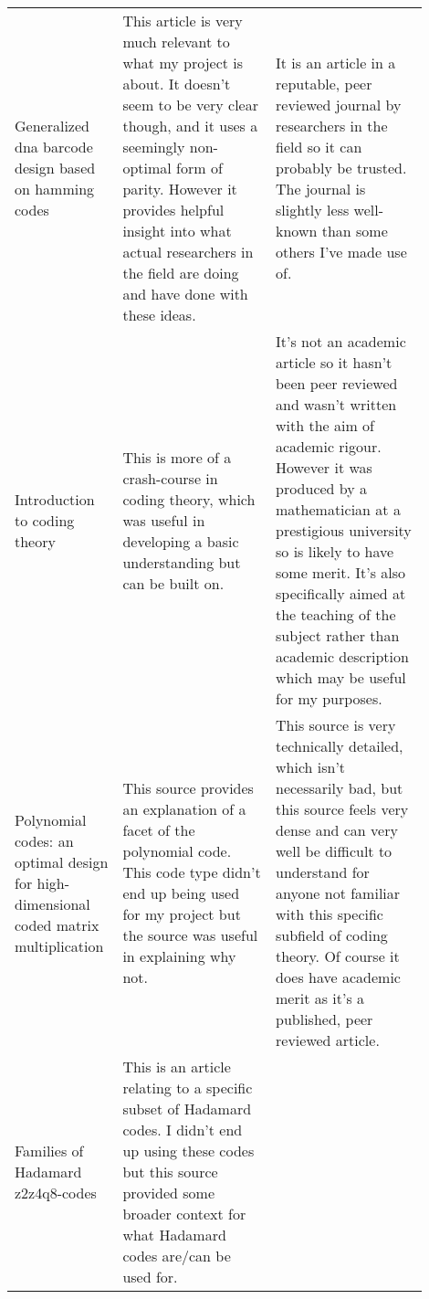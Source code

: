 \documentclass[a4paper,11pt]{article}
\begin{document}
\begin{center}
{\begin{longtable}{p{0.2\linewidth} p{0.35\linewidth} p{0.35\linewidth}}
    Generalized dna barcode design based on hamming codes \cite{HammingBarcodes2012BystrykhLeonid} &

    This article is very much relevant to what my project is about. It doesn't
    seem to be very clear though, and it uses a seemingly non-optimal form of
    parity. However it provides helpful insight into what actual researchers in
    the field are doing and have done with these ideas. &

    It is an article in a reputable, peer reviewed journal by researchers in
    the field so it can probably be trusted. The journal is slightly less
    well-known than some others I've made use of. \\

    Introduction to coding theory \cite{CodeIntro2010Guruswami} &

    This is more of a crash-course in coding theory, which was useful in
    developing a basic understanding but can be built on. &

    It's not an academic article so it hasn't been peer reviewed and wasn't
    written with the aim of academic rigour. However it was produced by a
    mathematician at a prestigious university so is likely to have some merit.
    It's also specifically aimed at the teaching of the subject rather than
    academic description which may be useful for my purposes. \\

    Polynomial codes: an optimal design for high-dimensional coded matrix multiplication \cite{PolynomialCodes2017MaddahAvestimehr} &

    This source provides an explanation of a facet of the polynomial code. This
    code type didn't end up being used for my project but the source was useful
    in explaining why not. &

    This source is very technically detailed, which isn't necessarily bad, but
    this source feels very dense and can very well be difficult to understand
    for anyone not familiar with this specific subfield of coding theory.  Of
    course it does have academic merit as it's a published, peer reviewed
    article. \\

    Families of Hadamard z2z4q8-codes \cite{HadamardZ2Z2012RioRifa} &

    This is an article relating to a specific subset of Hadamard codes. I
    didn't end up using these codes but this source provided some broader
    context for what Hadamard codes are/can be used for. &


\end{longtable}}
\end{center}
\end{document}
